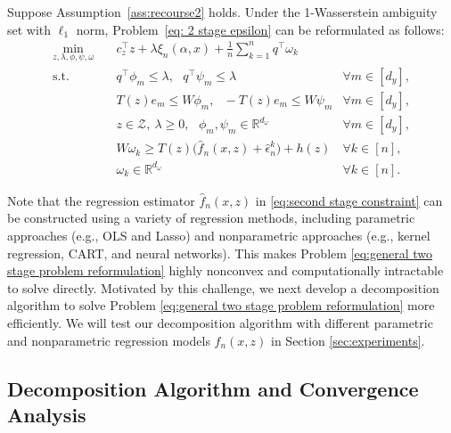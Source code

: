 \documentclass[onefignum,onetabnum]{siamart251216}
\begin{document}
\begin{proposition}
Suppose Assumption\ \ref{ass:recourse2} holds. Under the 1-Wasserstein ambiguity set with $\ell_1$ norm, Problem\ \eqref{eq: 2 stage epsilon} can be reformulated as follows:
\allowdisplaybreaks
\begin{subequations}\label{eq:general two stage problem reformulation}
\begin{align}
\min_{z,\lambda,\phi,\psi,\omega} \quad & c_z^\top z + \lambda \xi_n(\alpha,x) + \frac{1}{n} \sum_{k=1}^n q^\top \omega_k \nonumber &  \\
    \textrm{s.t.} 
    \quad & q^\top \phi_m \leq \lambda,\ \ \ q^\top \psi_m \leq \lambda & \forall m \in [d_y], \label{eq:wass dual constr 1} \\
    \quad & T(z)e_m \leq W\phi_m,\ \ \ -T(z)e_m \leq W\psi_m & \forall m \in [d_y], \label{eq:wass dual constr 2} \\
    \quad & z\in\mathcal{Z},\ \lambda \geq 0,\ \ \ \phi_m, \psi_m \in \mathbb{R}^{d_\omega} & \forall m \in [d_y],\label{eq:wass dual constr 3}\\
    \quad & W\omega_k\ge T(z)\bigl(\hat{f}_n(x,z) + \hat{\epsilon}_n^k\bigr) + h(z) & \forall k \in [n], \label{eq:second stage constraint} \\
    \quad & \omega_k \in \mathbb{R}^{d_{\omega}} & \forall k\in[n]. \label{eq:wass dual constr 4}
\end{align}
\end{subequations}
\end{proposition}
Note that the regression estimator $\hat f_n(x,z)$ in \eqref{eq:second stage constraint} can be constructed using a variety of regression methods, including parametric approaches (e.g., OLS and Lasso) and nonparametric approaches (e.g., kernel regression, CART, and neural networks). This makes Problem \eqref{eq:general two stage problem reformulation} highly nonconvex and computationally intractable to solve directly. Motivated by this challenge, we next develop a decomposition algorithm to solve Problem \eqref{eq:general two stage problem reformulation} more efficiently. We will test our decomposition algorithm with different parametric and nonparametric regression models $\hat f_n(x,z)$ in Section \ref{sec:experiments}.


\subsection{Decomposition Algorithm and Convergence Analysis}
\label{sec:algorithm}
\end{document}
